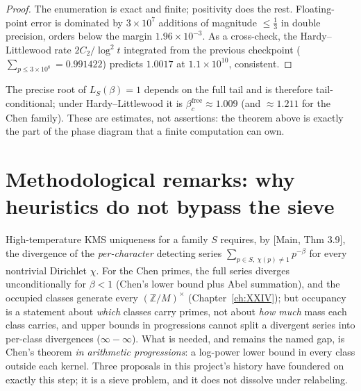 \begin{proof}
The enumeration is exact and finite; positivity does the rest. Floating-point error is
dominated by $3\times10^7$ additions of magnitude $\le\frac13$ in double precision,
orders below the margin $1.96\times10^{-3}$. As a cross-check, the Hardy--Littlewood
rate $2C_2/\log^2t$ integrated from the previous checkpoint
($\sum_{p\le3\times10^8}=0.991422$) predicts $1.0017$ at $1.1\times10^{10}$, consistent.
\end{proof}

\begin{remark}
The precise root of $L_S(\beta)=1$ depends on the full tail and is therefore
tail-conditional; under Hardy--Littlewood it is $\beta_c^{\mathrm{free}}\approx1.009$
(and $\approx1.211$ for the Chen family). These are estimates, not assertions: the
theorem above is exactly the part of the phase diagram that a finite computation can own.
\end{remark}

\section{Methodological remarks: why heuristics do not bypass the sieve}\label{XXXV:sec:method}

\begin{remark}\label{XXXV:rem:occupancy}
High-temperature KMS uniqueness for a family $S$ requires, by [Main, Thm 3.9], the
divergence of the \emph{per-character} detecting series
$\sum_{p\in S,\ \chi(p)\ne1}p^{-\beta}$ for every nontrivial Dirichlet $\chi$. For the
Chen primes, the full series diverges unconditionally for $\beta<1$ (Chen's lower bound
plus Abel summation), and the occupied classes generate every $(\mathbb Z/M)^\times$
(Chapter~\ref{ch:XXIV}); but occupancy is a statement about \emph{which} classes carry primes, not
about \emph{how much} mass each class carries, and upper bounds in progressions cannot
split a divergent series into per-class divergences ($\infty-\infty$). What is needed,
and remains the named gap, is Chen's theorem \emph{in arithmetic progressions}: a
log-power lower bound in every class outside each kernel. Three proposals in this
project's history have foundered on exactly this step; it is a sieve problem, and it does
not dissolve under relabeling.
\end{remark}

